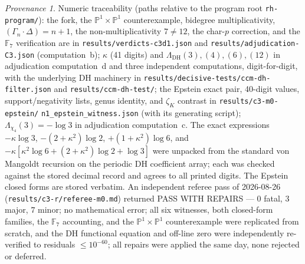 \documentclass[11pt]{article}
\theoremstyle{plain}
\theoremstyle{definition}
\theoremstyle{remark}
\newtheorem*{provenance}{Provenance}
\begin{document}
\begin{provenance}
Numeric traceability (paths relative to the program root
\texttt{rh-program/}): the fork, the
$\mathbb{P}^1 \times \mathbb{P}^1$ counterexample, bidegree multiplicativity,
$(\Gamma_n \cdot \Delta) = n+1$, the non-multiplicativity $7 \ne 12$, the
char-$p$ correction, and the $\mathbb{F}_7$ verification are in
\texttt{results/verdicts-c3d1.json} and \texttt{results/adjudication-C3.json}
(computation~b); $\kappa$ (41 digits) and
$\Lambda_{\mathrm{DH}}(3), (4), (6), (12)$ in adjudication computation~d and
three independent computations, digit-for-digit, with the underlying DH
machinery in \texttt{results/decisive-tests/ccm-dh-filter.json} and
\texttt{results/ccm-dh-test/}; the Epstein exact pair, 40-digit values,
support/negativity lists, genus identity, and $\zeta_K$ contrast in
\texttt{results/c3-m0-epstein/}\allowbreak
\texttt{n1\_epstein\_witness.json} (with its generating
script); $\Lambda_{\chi_4}(3) = -\log 3$ in adjudication computation~c. The
exact expressions $-\kappa \log 3$, $-(2+\kappa^2)\log 2$,
$+(1+\kappa^2)\log 6$, and
$-\kappa[\kappa^2 \log 6 + (2+\kappa^2)\log 2 + \log 3]$ were unpacked from
the standard von Mangoldt recursion on the periodic DH coefficient array; each
was checked against the stored decimal record and agrees to all printed
digits. The Epstein closed forms are stored verbatim. An independent referee
pass of 2026-08-26 (\texttt{results/c3-r/referee-m0.md}) returned PASS WITH
REPAIRS --- $0$ fatal, $3$ major, $7$ minor; no mathematical error; all six
witnesses, both closed-form families, the $\mathbb{F}_7$ accounting, and the
$\mathbb{P}^1 \times \mathbb{P}^1$ counterexample were replicated from
scratch, and the DH functional equation and off-line zero were independently
re-verified to residuals $\le 10^{-60}$; all repairs were applied the same
day, none rejected or deferred.
\end{provenance}
\end{document}
